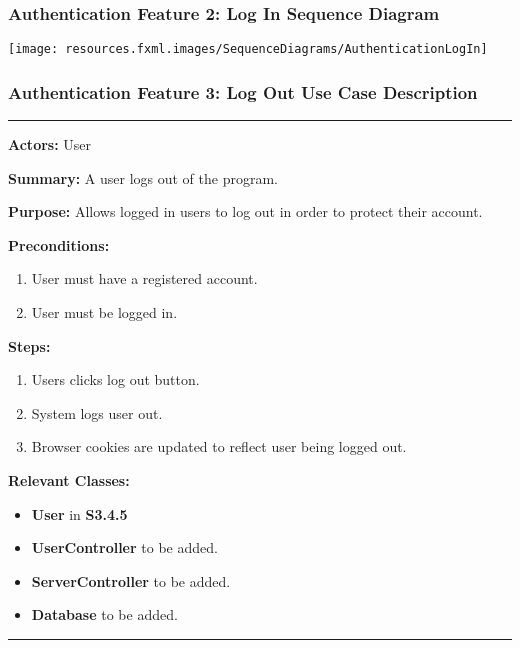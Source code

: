 \documentclass[twoside,letterpaper]{article}
\begin{document}
\subsubsection[Authentication Feature 2: Log In Sequence Diagram]{\rmfamily\bfseries\color{black}
	Authentication Feature 2: Log In Sequence Diagram}
\hypertarget{RefHeading22059017292}{}

\bigskip

\texttt{[image: resources.fxml.images/SequenceDiagrams/AuthenticationLogIn]}
\label{a:sd2}
\newpage

\subsubsection[Authentication Feature 3: Log Out Use Case Description]{\rmfamily\bfseries\color{black}
	Authentication Feature 3: Log Out Use Case Description}
	\label{a:uc3}
\hypertarget{RefHeading22059017292}{}

\hrule
\vspace{8pt}
\noindent\textbf{Actors:} User \newline

\noindent\textbf{Summary:} A user logs out of the program.  \newline

\noindent\textbf{Purpose:} Allows logged in users to log out in order to protect their account.  \newline

\noindent\textbf{Preconditions:}
\begin{enumerate}
	\item User must have a registered account.
	\item User must be logged in.
\end{enumerate}

\noindent\textbf{Steps:}
\begin{enumerate}
	\item Users clicks log out button.
	\item System logs user out.
	\item Browser cookies are updated to reflect user being logged out.
\end{enumerate}

\noindent\textbf{Relevant Classes:}
\begin{itemize}
	\item \textbf{User} in \textbf{S3.4.5}
	\item \textbf{UserController} to be added.
	\item \textbf{ServerController} to be added.
	\item \textbf{Database} to be added.
\end{itemize}
\vspace{8pt}
\hrule
\newpage
\end{document}
